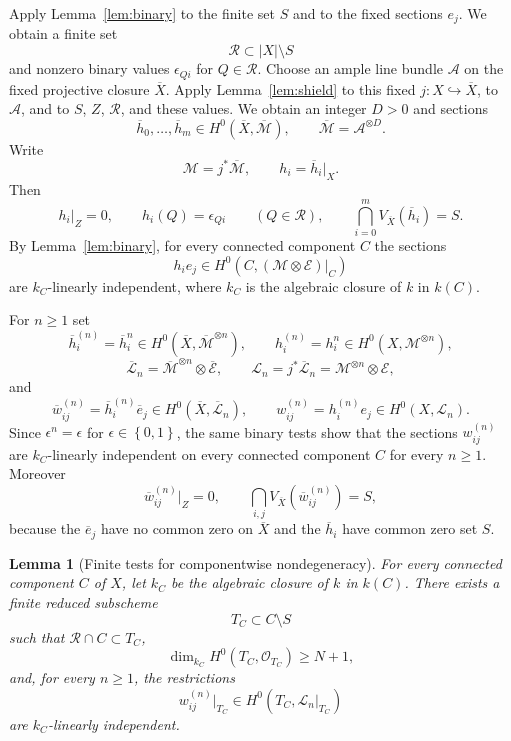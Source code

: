 \documentclass{lms}
\newtheorem{lemma}[theorem]{Lemma}
\newcommand{\Ample}{\mathcal A}
\newcommand{\OO}{\mathcal O}
\newcommand{\LL}{\mathcal L}
\newcommand{\MM}{\mathcal M}
\newcommand{\EE}{\mathcal E}
\newcommand{\barX}{\overline{X}}
\newcommand{\set}[1]{\left\{#1\right\}}
\begin{document}
Apply Lemma~\ref{lem:binary} to the finite set $S$ and to the fixed sections $e_j$.  We obtain a finite set
\[
        \mathcal R\subset |X|\setminus S
\]
and nonzero binary values $\epsilon_{Qi}$ for $Q\in\mathcal R$.  Choose an ample line bundle $\Ample$ on the fixed projective closure $\barX$.  Apply Lemma~\ref{lem:shield} to this fixed $j:X\hookrightarrow\barX$, to $\Ample$, and to $S$, $Z$, $\mathcal R$, and these values.  We obtain an integer $D>0$ and sections
\[
        \overline h_0,\ldots,\overline h_m\in H^0(\barX,\overline{\MM}),
        \qquad
        \overline{\MM}=\Ample^{\otimes D}.
\]
Write
\[
        \MM=j^*\overline{\MM},
        \qquad
        h_i=\overline h_i|_X .
\]
Then
\[
        h_i|_Z=0,
        \qquad
        h_i(Q)=\epsilon_{Qi}\qquad(Q\in\mathcal R),
        \qquad
        \bigcap_{i=0}^{m}V_{\barX}(\overline h_i)=S.
\]
By Lemma~\ref{lem:binary}, for every connected component $C$ the sections
\[
        h_i e_j\in H^0(C,(\MM\otimes\EE)|_C)
\]
are $k_C$-linearly independent, where $k_C$ is the algebraic closure of $k$ in $k(C)$.

For $n\ge1$ set
\[
        \overline h_i^{(n)}=\overline h_i^n\in H^0(\barX,\overline{\MM}^{\otimes n}),
        \qquad
        h_i^{(n)}=h_i^n\in H^0(X,\MM^{\otimes n}),
\]
\[
        \overline{\LL}_n=\overline{\MM}^{\otimes n}\otimes\overline{\EE},
        \qquad
        \LL_n=j^*\overline{\LL}_n=\MM^{\otimes n}\otimes\EE,
\]
and
\[
        \overline w_{ij}^{(n)}=\overline h_i^{(n)}\overline e_j\in H^0(\barX,\overline{\LL}_n),
        \qquad
        w_{ij}^{(n)}=h_i^{(n)}e_j\in H^0(X,\LL_n).
\]
Since $\epsilon^n=\epsilon$ for $\epsilon\in\set{0,1}$, the same binary tests show that the sections $w_{ij}^{(n)}$ are $k_C$-linearly independent on every connected component $C$ for every $n\ge1$.  Moreover
\[
        \overline w_{ij}^{(n)}|_Z=0,
        \qquad
        \bigcap_{i,j}V_{\barX}(\overline w_{ij}^{(n)})=S,
\]
because the $\overline e_j$ have no common zero on $\barX$ and the $\overline h_i$ have common zero set $S$.

\begin{lemma}[Finite tests for componentwise nondegeneracy]\label{lem:T}
For every connected component $C$ of $X$, let $k_C$ be the algebraic closure of $k$ in $k(C)$.  There exists a finite reduced subscheme
\[
        T_C\subset C\setminus S
\]
such that $\mathcal R\cap C\subset T_C$,
\[
        \dim_{k_C} H^0(T_C,\OO_{T_C})\ge N+1,
\]
and, for every $n\ge1$, the restrictions
\[
        w_{ij}^{(n)}|_{T_C}
        \in H^0(T_C,\LL_n|_{T_C})
\]
are $k_C$-linearly independent.
\end{lemma}
\end{document}
